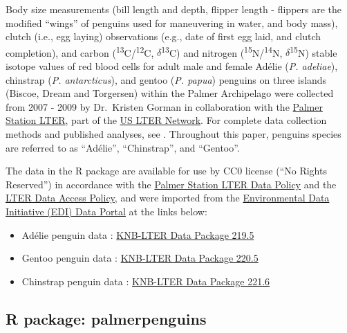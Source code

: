 Body size measurements (bill length and depth, flipper length - flippers
are the modified ``wings'' of penguins used for maneuvering in water,
and body mass), clutch (i.e., egg laying) observations (e.g., date of
first egg laid, and clutch completion), and carbon
(\textsuperscript{13}C/\textsuperscript{12}C,
\(\delta\)\textsuperscript{13}C) and nitrogen
(\textsuperscript{15}N/\textsuperscript{14}N,
\(\delta\)\textsuperscript{15}N) stable isotope values of red blood
cells for adult male and female Adélie (\emph{P. adeliae}), chinstrap
(\emph{P. antarcticus}), and gentoo (\emph{P. papua}) penguins on three
islands (Biscoe, Dream and Torgersen) within the Palmer Archipelago were
collected from 2007 - 2009 by Dr.~Kristen Gorman in collaboration with
the \href{https://pal.lternet.edu/}{Palmer Station LTER}, part of the
\href{https://lternet.edu/}{US LTER Network}. For complete data
collection methods and published analyses, see
\citet{gorman_ecological_2014}. Throughout this paper, penguins species
are referred to as ``Adélie'', ``Chinstrap'', and ``Gentoo''.

The data in the  R package are available for use by
CC0 license (``No Rights Reserved'') in accordance with the
\href{https://pal.lternet.edu/data/policies}{Palmer Station LTER Data
Policy} and the \href{https://lternet.edu/data-access-policy/}{LTER Data
Access Policy}, and were imported from the
\href{https://environmentaldatainitiative.org/}{Environmental Data
Initiative (EDI) Data Portal} at the links below:

\begin{itemize}
\tightlist
\item
  Adélie penguin data
  \citep{palmer_station_antarctica_lter_structural_2020}:
  \href{https://portal.edirepository.org/nis/mapbrowse?packageid=knb-lter-pal.219.5}{KNB-LTER
  Data Package 219.5}
\item
  Gentoo penguin data
  \citep{palmer_station_antarctica_lter_structural_2020-1}:
  \href{https://portal.edirepository.org/nis/mapbrowse?packageid=knb-lter-pal.220.5}{KNB-LTER
  Data Package 220.5}
\item
  Chinstrap penguin data
  \citep{palmer_station_antarctica_lter_structural_2020-2}:
  \href{https://portal.edirepository.org/nis/mapbrowse?packageid=knb-lter-pal.221.6}{KNB-LTER
  Data Package 221.6}
\end{itemize}

\hypertarget{r-package-palmerpenguins}{%
\subsection{R package: palmerpenguins}\label{r-package-palmerpenguins}}

